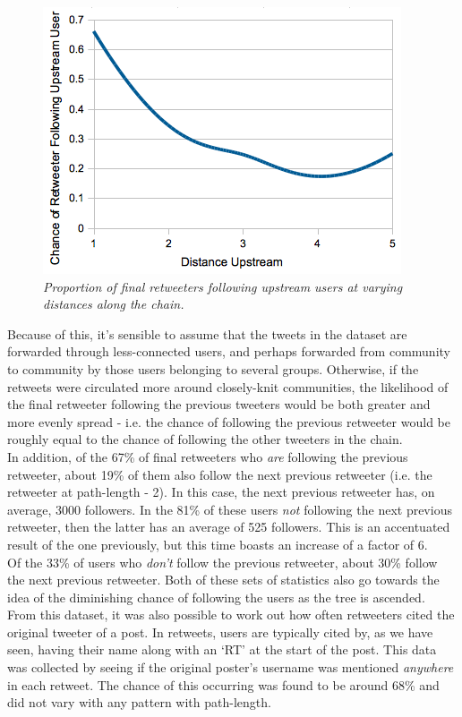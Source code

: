 \begin{figure}[h]
\includegraphics[scale=0.55]{4.Chapter1/Media/following-possibility.png} 
\caption{\textit{Proportion of final retweeters following upstream users at varying distances along the chain.}}
\label{fig:following-possibility}
\end{figure}
Because of this, it's sensible to assume that the tweets in the dataset are forwarded through less-connected users, and perhaps forwarded from community to community by those users belonging to several groups. Otherwise, if the retweets were circulated more around closely-knit communities, the likelihood of the final retweeter following the previous tweeters would be both greater and more evenly spread - i.e. the chance of following the previous retweeter would be roughly equal to the chance of following the other tweeters in the chain.\\
In addition, of the 67\% of final retweeters who \textit{are} following the previous retweeter, about 19\% of them also follow the next previous retweeter (i.e. the retweeter at path-length - 2). In this case, the next previous retweeter has, on average, 3000 followers. In the 81\% of these users \textit{not} following the next previous retweeter, then the latter has an average of 525 followers. This is an accentuated result of the one previously, but this time boasts an increase of a factor of 6.\\
Of the 33\% of users who \textit{don't} follow the previous retweeter, about 30\% follow the next previous retweeter. Both of these sets of statistics also go towards the idea of the diminishing chance of following the users as the tree is ascended.\\
From this dataset, it was also possible to work out how often retweeters cited the original tweeter of a post. In retweets, users are typically cited by, as we have seen, having their name along with an `RT' at the start of the post. This data was collected by seeing if the original poster's username was mentioned \textit{anywhere} in each retweet. The chance of this occurring was found to be around 68\% and did not vary with any pattern with path-length.
 
